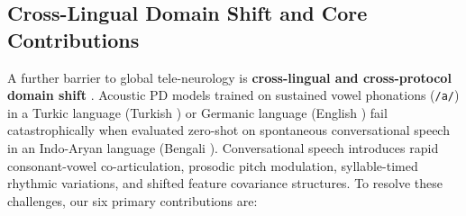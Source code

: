 \documentclass[journal,10pt,twoside]{IEEEtran}
\begin{document}
\subsection{Cross-Lingual Domain Shift and Core Contributions}
A further barrier to global tele-neurology is \textbf{cross-lingual and cross-protocol domain shift} \cite{ref36,ref38,ref39}. Acoustic PD models trained on sustained vowel phonations (\texttt{/a/}) in a Turkic language (Turkish \cite{ref1}) or Germanic language (English \cite{ref3}) fail catastrophically when evaluated zero-shot on spontaneous conversational speech in an Indo-Aryan language (Bengali \cite{ref5}). Conversational speech introduces rapid consonant-vowel co-articulation, prosodic pitch modulation, syllable-timed rhythmic variations, and shifted feature covariance structures. To resolve these challenges, our six primary contributions are:
\end{document}

